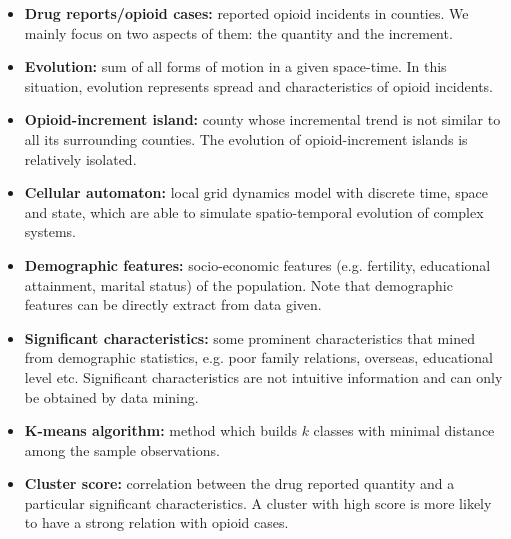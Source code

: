 \documentclass[a4paper]{article}
\begin{document}
\begin{itemize}
  \item \textbf{Drug reports/opioid cases:} reported opioid incidents in counties. We mainly focus on two aspects of them: the quantity and the increment.
  \vspace{4pt}
  
  \item \textbf{Evolution:} sum of all forms of motion in a given space-time. In this situation, evolution represents spread and characteristics of opioid incidents.
  \vspace{4pt}
  
  \item \textbf{Opioid-increment island:} county whose incremental trend is not similar to all its surrounding counties. The evolution of opioid-increment islands is relatively isolated.
  \vspace{4pt}
  
  \item \textbf{Cellular automaton:} local grid dynamics model with discrete time, space and state, which are able to simulate spatio-temporal evolution of complex systems.\cite{cellularA}
  \vspace{4pt}
  
  \item \textbf{Demographic features:} socio-economic features (e.g. fertility, educational attainment, marital status) of the population. Note that demographic features can be directly extract from data given.
  \vspace{4pt}
  
  \item \textbf{Significant characteristics:} some prominent characteristics that mined from demographic statistics, e.g. poor family relations, overseas, educational level etc. Significant characteristics are not intuitive information and can only be obtained by data mining.
  \vspace{4pt}
  
  \item \textbf{K-means algorithm:} method which builds $k$ classes with minimal distance among the sample observations. \cite{kmeans}
  \vspace{4pt}
  
  \item \textbf{Cluster score:} correlation between the drug reported quantity and a particular significant characteristics. A cluster with high score is more likely to have a strong relation with opioid cases.
  \vspace{4pt}
  

\end{itemize}
\end{document}
